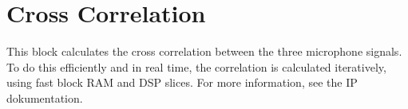 \section{Cross Correlation}
\label{sec::xcorr}

This block calculates the cross correlation between the three microphone signals.
To do this efficiently and in real time, the correlation is calculated iteratively, using fast block RAM and DSP slices.
For more information, see the IP dokumentation.